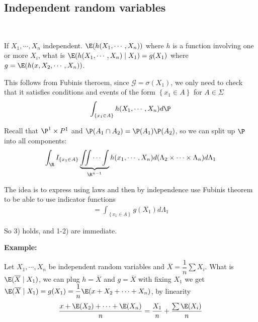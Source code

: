\subsection{Independent random variables}\hfill\\
\par\bigskip
\noindent If $X_1,\cdots,X_n$ independent. $\E(h(X_1,\cdots,X_n))$ where $h$ is a function involving one or more $X_i$, what is $\E(h(X_1,\cdots,X_n)\mid X_1) = g(X_1)$ where $g = \E(h(x,X_2,\cdots,X_n))$.\par
\noindent This follows from Fubinis theroem, since $\mathcal{G} = \sigma(X_1)$, we only need to check that it satisfies conditions and events of the form $\left\{x_1\in A\right\}$ for $A\in\Sigma$
\begin{equation*}
  \begin{gathered}
    \int_{\left\{x_1\in A\right\}}h(X_1,\cdots,X_n)d\P
  \end{gathered}
\end{equation*}\par
\noindent Recall that $\P^1\times P^1$ and $\P(A_1\cap A_2) = \P(A_1)\P(A_2)$, so we can split up $\P$ into all components:
\begin{equation*}
  \begin{gathered}
    \int_\R I_{\left\{x_1\in A\right\}}\underbrace{\iint\cdots\int}_{\R^{n-1}}h(x_1,\cdots,X_n)d(\Lambda_2\times\cdots\times\Lambda_n)d\Lambda_1
  \end{gathered}
\end{equation*}\par
\noindent The idea is to express using laws and then by independence use Fubinis theorem to be able to use indicator functions
\begin{equation*}
  \begin{gathered}
    =\int_{\left\{x_1\in A\right\}}g(X_1)d\Lambda_1
  \end{gathered}
\end{equation*}\par
\noindent So 3) holds, and 1-2) are immediate.
\par\bigskip
\noindent\textbf{Example:}\par
\noindent Let $X_1,\cdots,X_n$ be independent random variables and $\overline{X} = \dfrac{1}{n}\sum X_i$. What is $\E(\overline{X}\mid X_1)$, we can plug $h = \overline{X}$ and $g = \overline{X}$ with fixing $X_1$ we get $\E(\overline{X}\mid X_1) = g(X_1) = \dfrac{1}{n}\E(x+X_2+\cdots+X_n)$, by linearity
\begin{equation*}
  \begin{gathered}
    \dfrac{x+\E(X_2)+\cdots+\E(X_n)}{n} = \dfrac{X_1}{n}+\dfrac{\sum \E(X_i)}{n}
  \end{gathered}
\end{equation*}
\par\bigskip
